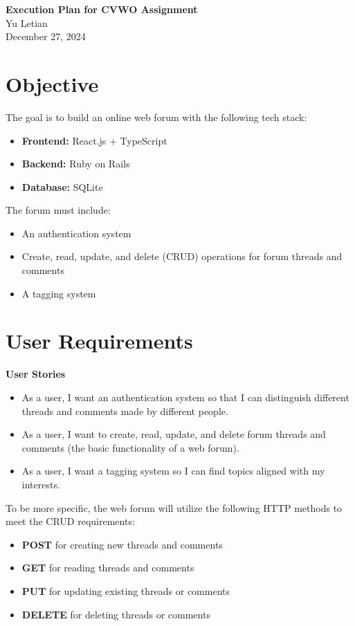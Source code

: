 \documentclass[a4paper,12pt]{article}
\begin{document}
\noindent
{\LARGE \textbf{Execution Plan for CVWO Assignment}} \\[12pt]
{\large Yu Letian} \\[6pt]
{\normalsize December 27, 2024} \\[20pt]

\begin{multicols}{2}  %

\section{Objective}
The goal is to build an online web forum with the following tech stack:
\begin{itemize}
    \item \textbf{Frontend:} React.js + TypeScript
    \item \textbf{Backend:} Ruby on Rails
    \item \textbf{Database:} SQLite
\end{itemize}

\noindent The forum must include:
\begin{itemize}
    \item An authentication system
    \item Create, read, update, and delete (CRUD) operations for forum threads and comments
    \item A tagging system
\end{itemize}

\section{User Requirements}
\textbf{User Stories}
\begin{itemize}
    \item As a user, I want an authentication system so that I can distinguish different threads and comments made by different people.
    \item As a user, I want to create, read, update, and delete forum threads and comments (the basic functionality of a web forum).
    \item As a user, I want a tagging system so I can find topics aligned with my interests.
\end{itemize}

To be more specific, the web forum will utilize the following HTTP methods to meet the CRUD requirements:
\begin{itemize}
    \item \textbf{POST} for creating new threads and comments
    \item \textbf{GET} for reading threads and comments
    \item \textbf{PUT} for updating existing threads or comments
    \item \textbf{DELETE} for deleting threads or comments
\end{itemize}


\end{multicols}
\end{document}
